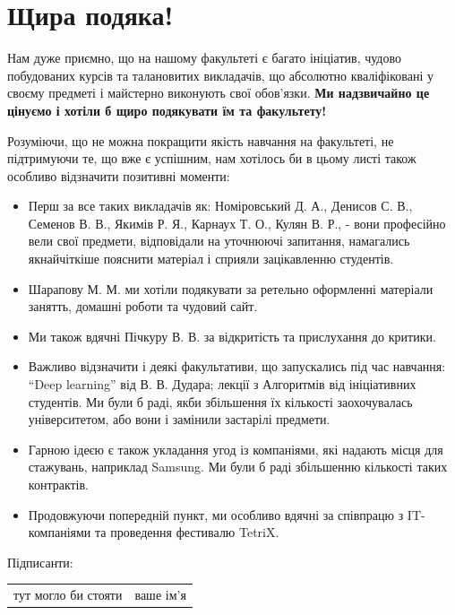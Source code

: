 \documentclass[14pt, a4paper]{extarticle}  %
\begin{document}
\newpage
\section{Щира подяка!}
Нам дуже приємно, що на нашому факультеті є багато ініціатив, чудово побудованих курсів та талановитих викладачів, що абсолютно кваліфіковані у своєму предметі і майстерно виконують свої обов'язки. \textbf{Ми надзвичайно це цінуємо і хотіли б щиро подякувати їм та факультету! }\medskip

Розуміючи, що не можна покращити якість навчання на факультеті, не підтримуючи те, що вже є успішним, нам хотілось би в цьому листі також особливо  відзначити позитивні моменти:
\begin{itemize}
    \item Перш за все таких викладачів як: Номіровський Д. А., Денисов С. В., Семенов В. В., Якимів Р. Я., Карнаух Т. О., Кулян В. Р., - вони професійно вели свої предмети, відповідали на уточнюючі запитання, намагались якнайчіткіше пояснити матеріал і сприяли зацікавленню студентів. 

\item Шарапову М. М.  ми хотіли подякувати за ретельно оформленні матеріали занятть, домашні роботи та чудовий сайт. 

\item Ми також вдячні Пічкуру В. В. за відкритість та прислухання до критики.

\item Важливо відзначити і деякі факультативи, що запускались під час навчання: ``Deep learning'' від В. В. Дудара; лекції з Алгоритмів від ініціативних студентів. Ми були б раді, якби збільшення їх кількості заохочувалась університетом, або вони і замінили застарілі предмети.

\item Гарною ідеєю є також укладання угод із компаніями, які надають місця для стажувань, наприклад Samsung. Ми були б раді збільшенню кількості таких контрактів.

\item Продовжуючи попередній пункт, ми особливо вдячні за співпрацю з IT-компаніями та проведення фестивалю TetriX. 
\end{itemize}

\newpage
Підписанти:

\begin{tabular}{c|c}
\hline
тут могло би стояти & ваше ім'я \\
\end{tabular}
\end{document}
